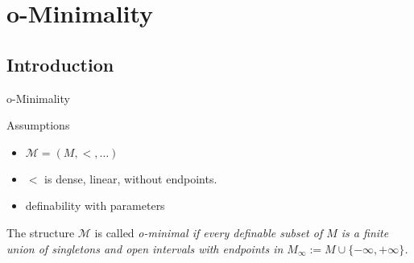
\section{o-Minimality}
\subsection{Introduction}


\begin{frame}{o-Minimality}
	\begin{block}{Assumptions}
		\begin{itemize}
			\item $\mathcal{M}=(M,<,\ldots)$
			\item $<$ is dense, linear, without endpoints.
			\item definability with parameters
		\end{itemize}
	\end{block}

	\begin{definition}
		The structure $\mathcal{M}$ is called \em o-minimal \em if every definable subset of $M$ is a finite union of singletons and open intervals with endpoints in $M_{\infty}:=M\cup\{-\infty,+\infty\}$.
	\end{definition}
\end{frame}